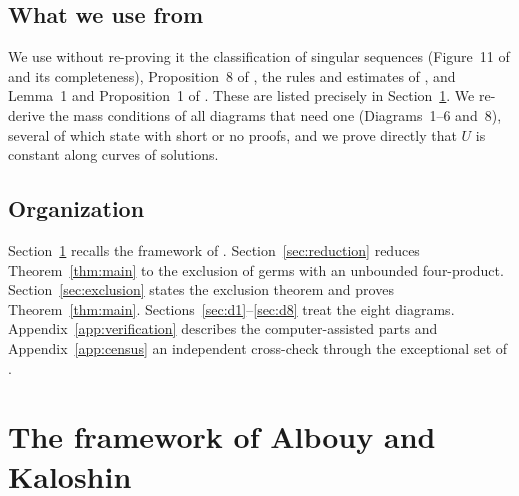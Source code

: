 \documentclass[11pt]{amsart}
\theoremstyle{definition}
\theoremstyle{remark}
\begin{document}
\subsection*{What we use from \texorpdfstring{\cite{AK}}{Albouy and Kaloshin}}
We use without re-proving it the classification of singular sequences (Figure~11 of
\cite{AK} and its completeness), Proposition~8 of \cite{AK}, the rules and estimates of
\cite[\S3]{AK}, and Lemma~1 and Proposition~1 of \cite{AK}.  These are listed precisely in
Section~\ref{sec:ak}.  We re-derive the mass conditions of all diagrams that need one
(Diagrams~1--6 and~8), several of which \cite[\S\S8.3--8.8]{AK} state with short or no proofs,
and we prove directly that $U$ is constant along curves of solutions.

\subsection*{Organization}
Section~\ref{sec:ak} recalls the framework of \cite{AK}.  Section~\ref{sec:reduction} reduces
Theorem~\ref{thm:main} to the exclusion of germs with an unbounded four-product.
Section~\ref{sec:exclusion} states the exclusion theorem and proves Theorem~\ref{thm:main}.
Sections~\ref{sec:d1}--\ref{sec:d8} treat the eight diagrams.  Appendix~\ref{app:verification}
describes the computer-assisted parts and Appendix~\ref{app:census} an independent cross-check
through the exceptional set of \cite{AK}.


\section{The framework of Albouy and Kaloshin}\label{sec:ak}
\end{document}

